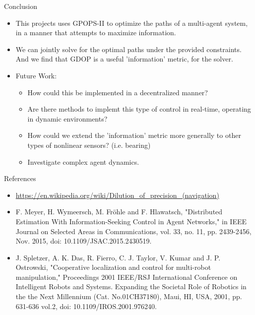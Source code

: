 \documentclass[9pt]{beamer}
\begin{document}
\begin{frame}{Conclusion}
\begin{itemize}
  \item This projects uses GPOPS-II to optimize the paths of a multi-agent system, in a manner that attempts to maximize information.
  \item We can jointly solve for the optimal paths under the provided constraints. And we find that GDOP is a useful 'information' metric, for the solver.
  \item Future Work:
  \begin{itemize}
    \item How could this be implemented in a decentralized manner?
    \item Are there methods to implemt this type of control in real-time, operating in dynamic environments?
    \item How could we extend the 'information' metric more generally to other types of nonlinear sensors? (i.e. bearing)
    \item Investigate complex agent dynamics.
  \end{itemize}
\end{itemize}
\begin{itemize}

\end{itemize}
\end{frame}

\begin{frame}{References}
\begin{itemize} \small
  \item \url{https://en.wikipedia.org/wiki/Dilution_of_precision_(navigation)}
  \item F. Meyer, H. Wymeersch, M. Fröhle and F. Hlawatsch, "Distributed Estimation With Information-Seeking Control in Agent Networks," in IEEE Journal on Selected Areas in Communications, vol. 33, no. 11, pp. 2439-2456, Nov. 2015, doi: 10.1109/JSAC.2015.2430519.
  \item J. Spletzer, A. K. Das, R. Fierro, C. J. Taylor, V. Kumar and J. P. Ostrowski, "Cooperative localization and control for multi-robot manipulation," Proceedings 2001 IEEE/RSJ International Conference on Intelligent Robots and Systems. Expanding the Societal Role of Robotics in the the Next Millennium (Cat. No.01CH37180), Maui, HI, USA, 2001, pp. 631-636 vol.2, doi: 10.1109/IROS.2001.976240.
\end{itemize}
\end{frame}
\end{document}
